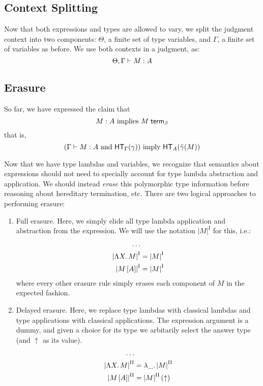 \documentclass{article}
\begin{document}
\subsection{Context Splitting}

Now that both expressions and types are allowed to vary, we split the judgment context into two
components: $\Theta$, a finite set of type variables, and $\Gamma$, a finite set of variables as
before. We use both contexts in a judgment, as:
\[ \hasEF{\Theta, \Gamma}{M}{A} \]

\subsection{Erasure}

So far, we have expressed the claim that
\[ M : A~\text{implies}~{M} \; \mathsf{term}_{\beta} \]
that is,
\[(\hasEF{\Gamma}{M}{A}~\text{and}~\hterm{\Gamma}{\gamma})~\text{imply}~\hterm{A}{\hat\gamma(M)} \]

\newcommand{\eraseone}[1]{\ensuremath{{|#1|}^{\textrm{I}}}}
\newcommand{\erasetwo}[1]{\ensuremath{{|#1|}^{\textrm{II}}}}
Now that we have type lambdas and variables, we recognize that semantics about expressions should not
need to specially account for type lambda abstraction and application. We should instead \emph{erase}
this polymorphic type information before reasoning about hereditary termination, etc. There are
two logical approaches to performing erasure:
\begin{enumerate}
    \item Full erasure. Here, we simply elide all type lambda application and abstraction from
    the expression. We will use the notation \eraseone{M} for this, i.e.:
    \begin{align*}
    \ldots &\\
    \eraseone{\tlam{X}{M}} &= \eraseone{M}\\
    \eraseone{\tap{M}{A}} &= \eraseone{M}
    \end{align*}
    where every other erasure rule simply erases each component of $M$ in the expected fashion.
    \item Delayed erasure. Here, we replace type lambdas with classical lambdas and type applications
    with classical applications. The expression argument is a dummy, and given a choice for its type
    we arbitarily select the answer type (and $\uparrow$ as its value).
    \begin{align*}
    \ldots &\\
    \erasetwo{\tlam{X}{M}} &= \alam{\erasetwo{M}}\\
    \erasetwo{\tap{M}{A}} &= \ap{\erasetwo{M}}{(\uparrow)}
    \end{align*}
\end{enumerate}
\end{document}
